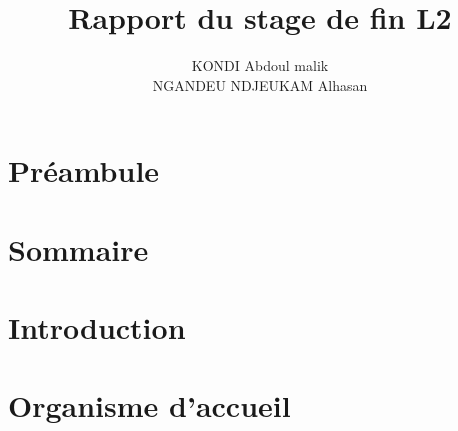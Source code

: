 \documentclass[12pt,a4paper]{article}
\author{KONDI Abdoul malik \\ NGANDEU NDJEUKAM Alhasan}
\title{Rapport du stage de fin L2}
\begin{document}
\maketitle
\tableofcontents
\newpage
\section{Préambule}
\section{Sommaire}
\section{Introduction}
\section{Organisme d'accueil}
\end{document}
